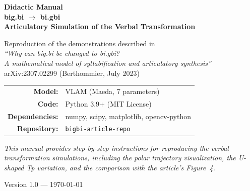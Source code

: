 \documentclass[11pt,a4paper]{article}
\begin{document}
\begin{titlepage}
\centering
\vspace*{2cm}
{\Huge\bfseries\color{blue!50!black}
Didactic Manual\\[0.3em]
\large big.bi $\to$ bi.gbi\\[0.5em]
\normalsize Articulatory Simulation of the Verbal Transformation
\par}
\vspace{1.5cm}

{\large
Reproduction of the demonstrations described in\\[0.3em]
\textit{``Why can big.bi be changed to bi.gbi?\\
A mathematical model of syllabification and articulatory synthesis''}\\[0.3em]
arXiv:2307.02299 (Berthommier, July 2023)
\par}

\vspace{2cm}

\begin{tabular}{rl}
\textbf{Model:} & VLAM (Maeda, 7 parameters) \\
\textbf{Code:} & Python 3.9+ (MIT License) \\
\textbf{Dependencies:} & numpy, scipy, matplotlib, opencv-python \\
\textbf{Repository:} & \texttt{bigbi-article-repo} \\
\end{tabular}

\vfill

{\small\itshape
This manual provides step-by-step instructions for reproducing the
verbal transformation simulations, including the polar trajectory
visualization, the U-shaped Tp variation, and the comparison with
the article's Figure~4.
}

\vspace{1cm}
{\small Version 1.0 --- \today}
\end{titlepage}

\tableofcontents
\newpage

\end{document}
